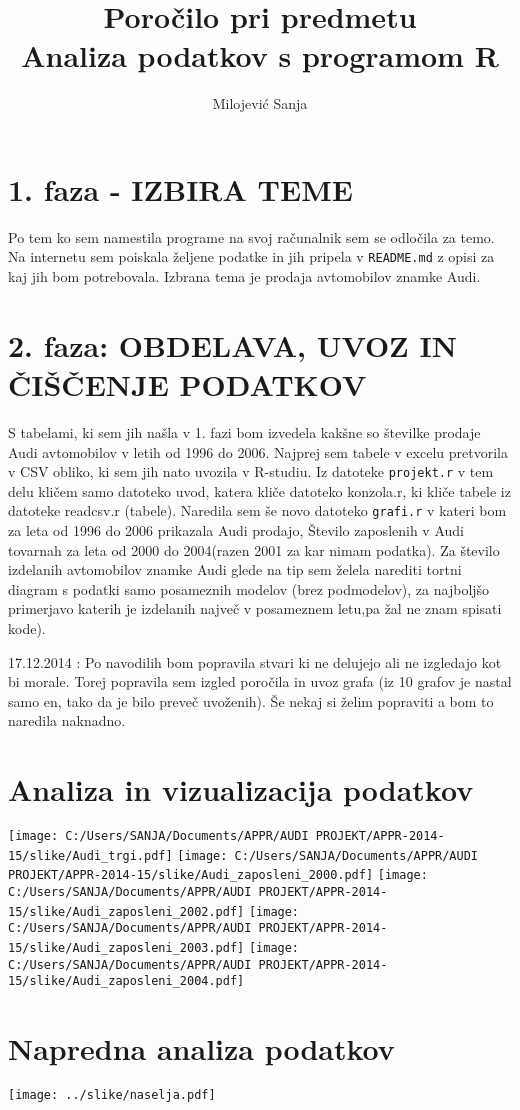 \documentclass[11pt,a4paper]{article}
\begin{document}
\title{Poročilo pri predmetu \\
Analiza podatkov s programom R}
\author{Milojević Sanja}
\maketitle

\section{1. faza - IZBIRA TEME}
Po tem ko sem namestila programe na svoj računalnik sem se odločila za temo. Na internetu sem poiskala željene podatke in jih pripela v \verb|README.md| z opisi za kaj jih bom potrebovala. Izbrana tema je prodaja avtomobilov znamke Audi.

\section{2. faza: OBDELAVA, UVOZ IN ČIŠČENJE PODATKOV}
S tabelami, ki sem jih našla v 1. fazi bom izvedela kakšne so številke prodaje Audi avtomobilov v letih od 1996 do 2006. Najprej sem tabele v excelu pretvorila v CSV obliko, ki sem jih nato uvozila v R-studiu. Iz datoteke \verb|projekt.r| v tem delu kličem samo datoteko uvod, katera kliče datoteko konzola.r, ki kliče tabele iz datoteke readcsv.r (tabele).
Naredila sem še novo datoteko \verb|grafi.r| v kateri bom za leta od 1996 do 2006 prikazala Audi prodajo, Število zaposlenih v Audi tovarnah za leta od 2000 do 2004(razen 2001 za kar nimam podatka). Za število izdelanih avtomobilov znamke Audi glede na tip sem želela narediti tortni diagram s podatki samo posameznih modelov (brez podmodelov), za najboljšo primerjavo katerih je izdelanih največ v posameznem letu,pa žal ne znam spisati kode).

17.12.2014 : Po navodilih bom popravila stvari ki ne delujejo ali ne izgledajo kot bi morale. Torej popravila sem izgled poročila in uvoz grafa (iz 10 grafov je nastal samo en, tako da je bilo preveč uvoženih). Še nekaj si želim popraviti a bom to naredila naknadno.

\section{Analiza in vizualizacija podatkov}

\texttt{[image: C:/Users/SANJA/Documents/APPR/AUDI PROJEKT/APPR-2014-15/slike/Audi\_trgi.pdf]}
\texttt{[image: C:/Users/SANJA/Documents/APPR/AUDI PROJEKT/APPR-2014-15/slike/Audi\_zaposleni\_2000.pdf]}
\texttt{[image: C:/Users/SANJA/Documents/APPR/AUDI PROJEKT/APPR-2014-15/slike/Audi\_zaposleni\_2002.pdf]}
\texttt{[image: C:/Users/SANJA/Documents/APPR/AUDI PROJEKT/APPR-2014-15/slike/Audi\_zaposleni\_2003.pdf]}
\texttt{[image: C:/Users/SANJA/Documents/APPR/AUDI PROJEKT/APPR-2014-15/slike/Audi\_zaposleni\_2004.pdf]}


\section{Napredna analiza podatkov}

\texttt{[image: ../slike/naselja.pdf]}
\end{document}
